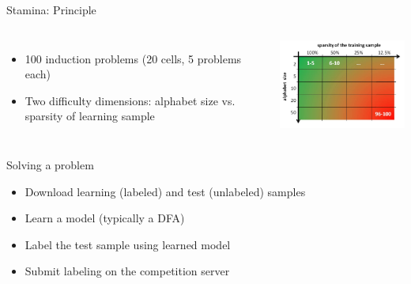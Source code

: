 \begin{frame}{Stamina: Principle}

  \begin{columns}
	  \begin{itemize}
	    \item 100 induction problems (20 cells, 5 problems each)
	    \item Two difficulty dimensions: alphabet size vs. sparsity of learning sample
	  \end{itemize}
	  \begin{center}
	    \includegraphics[width=6cm]{images/stamina_grid.jpg}
	  \end{center}
  \end{columns}

  \begin{block}{Solving a problem}
    \begin{itemize}
      \item Download learning (labeled) and test (unlabeled) samples
      \item Learn a model (typically a DFA)
      \item Label the test sample using learned model
      \item Submit labeling on the competition server
    \end{itemize}
  \end{block}


\end{frame}

